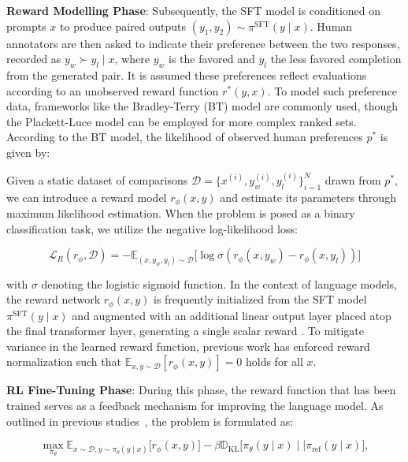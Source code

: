 \textbf{Reward Modelling Phase}: Subsequently, the SFT model is conditioned on prompts $x$ to produce paired outputs $(y_1, y_2)\sim \pi^\text{SFT}(y \mid x)$. Human annotators are then asked to indicate their preference between the two responses, recorded as $y_w\succ y_l \mid x$, where $y_w$ is the favored and $y_l$ the less favored completion from the generated pair. It is assumed these preferences reflect evaluations according to an unobserved reward function $r^*(y, x)$. To model such preference data, frameworks like the Bradley-Terry (BT) model \cite{bradley1952rankanalysis} are commonly used, though the Plackett-Luce model \citep{plackett1975analysis, luce2012individual} can be employed for more complex ranked sets. According to the BT model, the likelihood of observed human preferences $p^*$ is given by:

Given a static dataset of comparisons $\mathcal{D}=\bigl\{x^{(i)}, y_w^{(i)}, y_l^{(i)}\bigr\}_{i=1}^N$ drawn from $p^*$, we can introduce a reward model $r_{\phi}(x, y)$ and estimate its parameters through maximum likelihood estimation. When the problem is posed as a binary classification task, we utilize the negative log-likelihood loss:

\begin{equation}\label{eq:reward_model}
    \mathcal{L}_R(r_{\phi}, \mathcal{D}) = -\mathbb{E}_{(x, y_w, y_l)\sim \mathcal{D}}\bigl[\log \sigma(r_{\phi}(x, y_w)- r_{\phi}(x, y_l))\bigr]
\end{equation}

with $\sigma$ denoting the logistic sigmoid function. In the context of language models, the reward network $r_{\phi}(x, y)$ is frequently initialized from the SFT model $\pi^\text{SFT}(y \mid x)$ and augmented with an additional linear output layer placed atop the final transformer layer, generating a single scalar reward \cite{ziegler2020finetuning}. To mitigate variance in the learned reward function, previous work has enforced reward normalization such that $\mathbb{E}_{x,y\sim \mathcal{D}}\left[r_\phi(x, y)\right] = 0$ holds for all $x$.

\textbf{RL Fine-Tuning Phase}: During this phase, the reward function that has been trained serves as a feedback mechanism for improving the language model. As outlined in previous studies~\citep{jaques2017sequence, jaques2020human}, the problem is formulated as:

\begin{equation}\label{eq:RL}
\max_{\pi_{\theta}}  \mathbb{E}_{x\sim \mathcal{D}, y\sim \pi_{\theta}(y \mid x)}\bigl[r_{\phi}(x, y)\bigr] - \beta\mathbb{D}_{\textrm{KL}}\bigl[\pi_{\theta}(y\mid x)\mid \mid \pi_\text{ref}(y\mid x)\bigr],
\end{equation}

